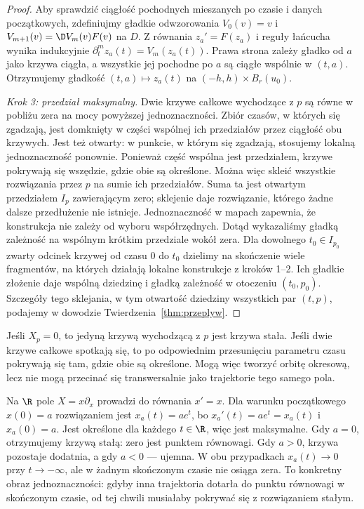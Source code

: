 \begin{proof}
Aby sprawdzić ciągłość pochodnych mieszanych po czasie i danych
początkowych, zdefiniujmy gładkie odwzorowania
$V_0(v)=v$ i $V_{m+1}(v)=\D V_m(v)F(v)$ na $D$.
Z równania $z_a'=F(z_a)$ i reguły łańcucha wynika indukcyjnie
$\partial_t^m z_a(t)=V_m(z_a(t))$. Prawa strona zależy
gładko od $a$ jako krzywa ciągła, a wszystkie jej pochodne
po $a$ są ciągłe wspólnie w $(t,a)$. Otrzymujemy gładkość
$(t,a)\mapsto z_a(t)$ na $(-h,h)\times B_r(u_0)$.

\emph{Krok 3: przedział maksymalny.}
Dwie krzywe całkowe wychodzące z $p$ są równe w pobliżu zera
na mocy powyższej jednoznaczności. Zbiór czasów, w których
się zgadzają, jest domknięty w części wspólnej ich
przedziałów przez ciągłość obu krzywych. Jest też otwarty:
w punkcie, w którym się zgadzają, stosujemy lokalną
jednoznaczność ponownie. Ponieważ część wspólna jest przedziałem,
krzywe pokrywają się wszędzie, gdzie obie są określone.
Można więc skleić wszystkie rozwiązania przez $p$ na sumie
ich przedziałów. Suma ta jest otwartym przedziałem $I_p$
zawierającym zero; sklejenie daje rozwiązanie, którego żadne
dalsze przedłużenie nie istnieje. Jednoznaczność w mapach
zapewnia, że konstrukcja nie zależy od wyboru współrzędnych.
Dotąd wykazaliśmy gładką zależność na wspólnym krótkim przedziale
wokół zera. Dla dowolnego $t_0\in I_{p_0}$ zwarty odcinek krzywej
od czasu $0$ do $t_0$ dzielimy na skończenie wiele fragmentów,
na których działają lokalne konstrukcje z kroków 1--2.
Ich gładkie złożenie daje wspólną dziedzinę i gładką zależność
w otoczeniu $(t_0,p_0)$. Szczegóły tego sklejania,
w tym otwartość dziedziny wszystkich par $(t,p)$,
podajemy w dowodzie Twierdzenia~\ref{thm:przeplyw}.
\end{proof}

Jeśli $X_p=0$, to jedyną krzywą wychodzącą z $p$ jest krzywa stała.
Jeśli dwie krzywe całkowe spotkają się, to po odpowiednim przesunięciu
parametru czasu pokrywają się tam, gdzie obie są określone.
Mogą więc tworzyć orbitę okresową, lecz nie mogą przecinać się
transwersalnie jako trajektorie tego samego pola.

\begin{przyklad}
Na $\R$ pole $X=x\partial_x$ prowadzi do równania $x'=x$.
Dla warunku początkowego $x(0)=a$ rozwiązaniem jest
$x_a(t)=ae^t$, bo $x_a'(t)=ae^t=x_a(t)$ i $x_a(0)=a$.
Jest określone dla każdego $t\in\R$, więc jest maksymalne.
Gdy $a=0$, otrzymujemy krzywą stałą: zero jest punktem
równowagi. Gdy $a>0$, krzywa pozostaje dodatnia, a gdy $a<0$
--- ujemna. W obu przypadkach $x_a(t)\to0$ przy $t\to-\infty$,
ale w żadnym skończonym czasie nie osiąga zera.
To konkretny obraz jednoznaczności: gdyby inna trajektoria
dotarła do punktu równowagi w skończonym czasie, od tej chwili
musiałaby pokrywać się z rozwiązaniem stałym.
\end{przyklad}

